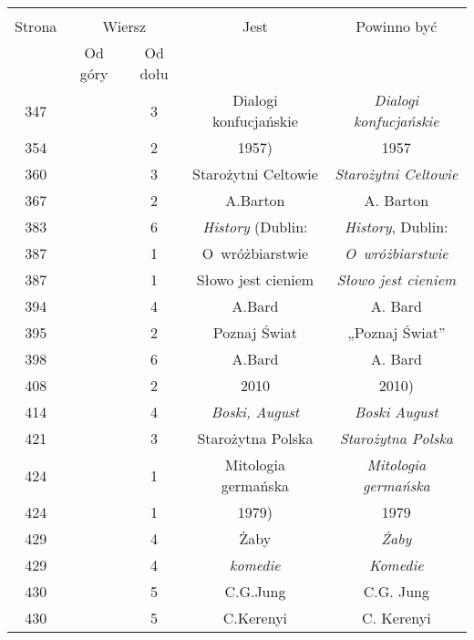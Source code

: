 \documentclass[a4paper,11pt]{article}
\begin{document}
\begin{center}
  \begin{tabular}{|c|c|c|c|c|}
    \hline
    & \multicolumn{2}{c|}{} & & \\
    Strona & \multicolumn{2}{c|}{Wiersz} & Jest
                              & Powinno być \\ \cline{2-3}
    & Od góry & Od dołu & & \\
    \hline
    347 & &  3 & Dialogi konfucjańskie & \emph{Dialogi konfucjańskie} \\
    354 & &  2 & 1957) & 1957 \\
    360 & &  3 & Starożytni Celtowie & \emph{Starożytni Celtowie} \\
    367 & &  2 & A.Barton & A. Barton \\
    383 & &  6 & \emph{History} (Dublin: & \emph{History}, Dublin: \\
    387 & &  1 & O~wróżbiarstwie & \emph{O~wróżbiarstwie} \\
    387 & &  1 & Słowo jest cieniem & \emph{Słowo jest cieniem} \\
    394 & &  4 & A.Bard & A. Bard \\
    395 & &  2 & Poznaj Świat & „Poznaj Świat” \\
    398 & &  6 & A.Bard & A. Bard \\
    408 & &  2 & 2010 & 2010) \\
    414 & &  4 & \emph{Boski, August} & \emph{Boski August} \\
    421 & &  3 & Starożytna Polska & \emph{Starożytna Polska} \\
    424 & &  1 & Mitologia germańska & \emph{Mitologia germańska} \\
    424 & &  1 & 1979) & 1979 \\
    429 & &  4 & Żaby & \emph{Żaby} \\
    429 & &  4 & \emph{komedie} & \emph{Komedie} \\
    430 & &  5 & C.G.Jung & C.G. Jung \\
    430 & &  5 & C.Kerenyi & C. Kerenyi \\
    \hline
  \end{tabular}


\end{center}
\end{document}
